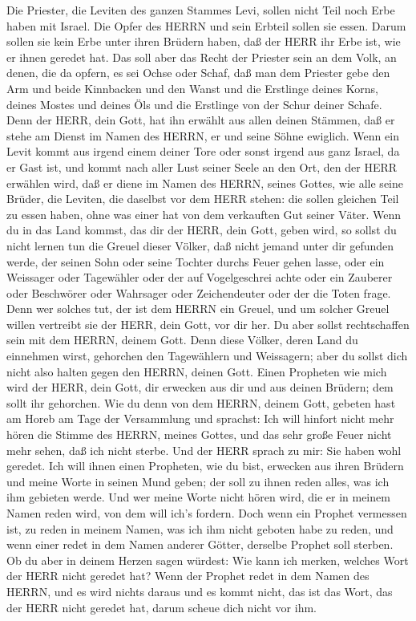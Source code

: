  Die Priester, die Leviten des ganzen Stammes Levi, sollen
nicht Teil noch Erbe haben mit Israel. Die Opfer des HERRN und sein
Erbteil sollen sie essen.  Darum sollen sie kein Erbe unter
ihren Brüdern haben, daß der HERR ihr Erbe ist, wie er ihnen geredet
hat.  Das soll aber das Recht der Priester sein an dem Volk,
an denen, die da opfern, es sei Ochse oder Schaf, daß man dem Priester
gebe den Arm und beide Kinnbacken und den Wanst  und die
Erstlinge deines Korns, deines Mostes und deines Öls und die Erstlinge
von der Schur deiner Schafe.  Denn der HERR, dein Gott, hat
ihn erwählt aus allen deinen Stämmen, daß er stehe am Dienst im Namen
des HERRN, er und seine Söhne ewiglich.  Wenn ein Levit
kommt aus irgend einem deiner Tore oder sonst irgend aus ganz Israel, da
er Gast ist, und kommt nach aller Lust seiner Seele an den Ort, den der
HERR erwählen wird,  daß er diene im Namen des HERRN, seines
Gottes, wie alle seine Brüder, die Leviten, die daselbst vor dem HERR
stehen:  die sollen gleichen Teil zu essen haben, ohne was
einer hat von dem verkauften Gut seiner Väter.  Wenn du in
das Land kommst, das dir der HERR, dein Gott, geben wird, so sollst du
nicht lernen tun die Greuel dieser Völker,  daß nicht
jemand unter dir gefunden werde, der seinen Sohn oder seine Tochter
durchs Feuer gehen lasse, oder ein Weissager oder Tagewähler oder der
auf Vogelgeschrei achte oder ein Zauberer  oder Beschwörer
oder Wahrsager oder Zeichendeuter oder der die Toten frage.
 Denn wer solches tut, der ist dem HERRN ein Greuel, und um
solcher Greuel willen vertreibt sie der HERR, dein Gott, vor dir her.
 Du aber sollst rechtschaffen sein mit dem HERRN, deinem
Gott.  Denn diese Völker, deren Land du einnehmen wirst,
gehorchen den Tagewählern und Weissagern; aber du sollst dich nicht also
halten gegen den HERRN, deinen Gott.  Einen Propheten wie
mich wird der HERR, dein Gott, dir erwecken aus dir und aus deinen
Brüdern; dem sollt ihr gehorchen.  Wie du denn von dem
HERRN, deinem Gott, gebeten hast am Horeb am Tage der Versammlung und
sprachst: Ich will hinfort nicht mehr hören die Stimme des HERRN, meines
Gottes, und das sehr große Feuer nicht mehr sehen, daß ich nicht sterbe.
 Und der HERR sprach zu mir: Sie haben wohl geredet.
 Ich will ihnen einen Propheten, wie du bist, erwecken aus
ihren Brüdern und meine Worte in seinen Mund geben; der soll zu ihnen
reden alles, was ich ihm gebieten werde.  Und wer meine
Worte nicht hören wird, die er in meinem Namen reden wird, von dem will
ich's fordern.  Doch wenn ein Prophet vermessen ist, zu
reden in meinem Namen, was ich ihm nicht geboten habe zu reden, und wenn
einer redet in dem Namen anderer Götter, derselbe Prophet soll sterben.
 Ob du aber in deinem Herzen sagen würdest: Wie kann ich
merken, welches Wort der HERR nicht geredet hat?  Wenn der
Prophet redet in dem Namen des HERRN, und es wird nichts daraus und es
kommt nicht, das ist das Wort, das der HERR nicht geredet hat, darum
scheue dich nicht vor ihm.

